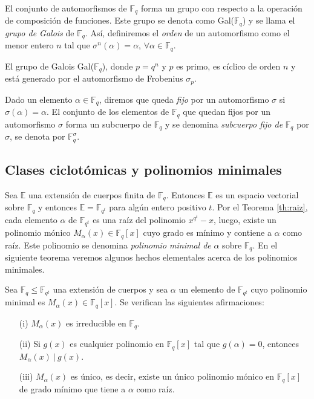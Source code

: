 El conjunto de automorfismos de $\mathbb{F}_q$ forma un grupo con respecto a la operación de composición de funciones. Este grupo se denota como Gal($\mathbb{F}_q$) y se llama el \emph{grupo de Galois} de $\mathbb{F}_q$. Así, definiremos el \emph{orden} de un automorfismo como el menor entero $n$ tal que $\sigma^n(\alpha) = \alpha$, $\forall \alpha \in \mathbb{F}_q$.

\begin{teorema}
    El grupo de Galois Gal($\mathbb{F}_q$), donde $p = q^n$ y $p$ es primo, es cíclico de orden $n$ y está generado por el automorfismo de Frobenius $\sigma_p$.
\end{teorema}

Dado un elemento $\alpha \in \mathbb{F}_q$, diremos que queda \emph{fijo} por un automorfismo $\sigma$ si $\sigma(\alpha) = \alpha$. El conjunto de los elementos de $\mathbb{F}_q$ que quedan fijos por un automorfismo $\sigma$ forma un subcuerpo de $\mathbb{F}_q$ y se denomina \emph{subcuerpo fijo de } $\mathbb{F}_q$ por $\sigma$, se denota por $\mathbb{F}_q^{\sigma}$.

\subsection{Clases ciclotómicas y polinomios minimales}\label{sec:ciclo}

Sea $\mathbb{E}$ una extensión de cuerpos finita de $\mathbb{F}_q$. Entonces $\mathbb{E}$ es un espacio vectorial sobre $\mathbb{F}_q$ y entonces $\mathbb{E} = \mathbb{F}_{q^t}$ para algún entero positivo $t$. Por el Teorema \ref{th:raiz}, cada elemento $\alpha$ de $\mathbb{F}_{q^t}$ es una raíz del polinomio $x^{q^t} - x$, luego, existe un polinomio mónico $M_{\alpha}(x) \in \mathbb{F}_q[x]$ cuyo grado es mínimo y contiene a $\alpha$ como raíz. Este polinomio se denomina \emph{polinomio minimal de } $\alpha$ sobre $\mathbb{F}_q$. En el siguiente teorema veremos algunos hechos elementales acerca de los polinomios minimales.

\begin{teorema}
Sea $\mathbb{F}_q \leq \mathbb{F}_{q^t}$ una extensión de cuerpos y sea $\alpha$ un elemento de $\mathbb{F}_{q^t}$ cuyo polinomio minimal es $M_{\alpha}(x) \in \mathbb{F}_q[x]$. Se verifican las siguientes afirmaciones:
\begin{itemize}
    \item[(i)] $M_{\alpha}(x)$ es irreducible en $\mathbb{F}_{q}$.
    \item[(ii)] Si $g(x)$ es cualquier polinomio en $\mathbb{F}_{q}[x]$ tal que $g(\alpha) = 0$, entonces $M_{\alpha}(x) \ | \ g(x)$.
    \item[(iii)] $M_{\alpha}(x)$ es único, es decir, existe un único polinomio mónico en $\mathbb{F}_q[x]$ de grado mínimo que tiene a $\alpha$ como raíz.
\end{itemize} 
\end{teorema}


